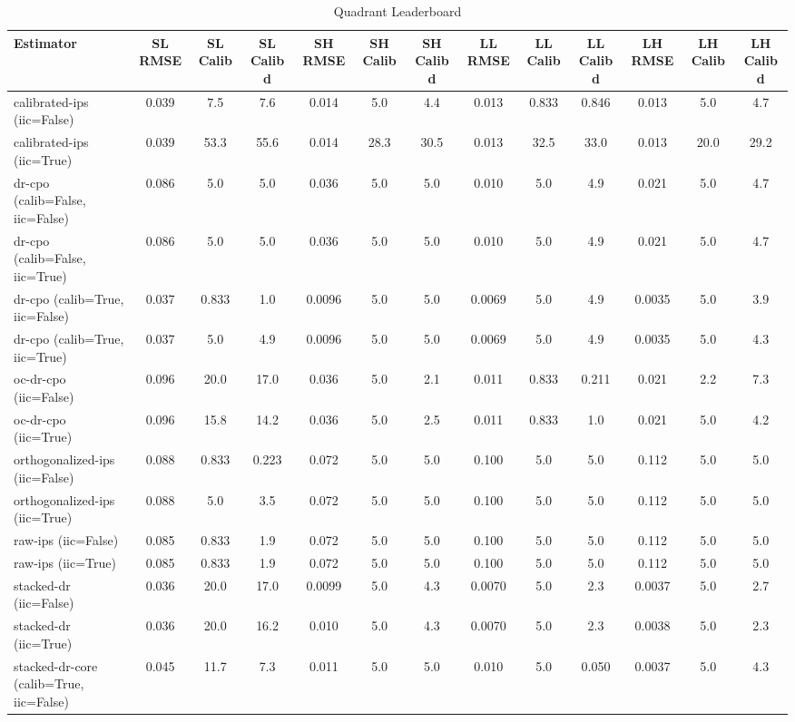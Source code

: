 \begin{table}[htbp]
\centering
\caption{Quadrant Leaderboard}
\label{tab:A1}
\begin{tabular}{l|cccccccccccc}
\toprule
Estimator & SL RMSE & SL Calib & SL Calib d & SH RMSE & SH Calib & SH Calib d & LL RMSE & LL Calib & LL Calib d & LH RMSE & LH Calib & LH Calib d \\
\midrule
calibrated-ips (iic=False) & 0.039 & 7.5 & 7.6 & 0.014 & 5.0 & 4.4 & 0.013 & 0.833 & 0.846 & 0.013 & 5.0 & 4.7 \\
calibrated-ips (iic=True) & 0.039 & 53.3 & 55.6 & 0.014 & 28.3 & 30.5 & 0.013 & 32.5 & 33.0 & 0.013 & 20.0 & 29.2 \\
dr-cpo (calib=False, iic=False) & 0.086 & 5.0 & 5.0 & 0.036 & 5.0 & 5.0 & 0.010 & 5.0 & 4.9 & 0.021 & 5.0 & 4.7 \\
dr-cpo (calib=False, iic=True) & 0.086 & 5.0 & 5.0 & 0.036 & 5.0 & 5.0 & 0.010 & 5.0 & 4.9 & 0.021 & 5.0 & 4.7 \\
dr-cpo (calib=True, iic=False) & 0.037 & 0.833 & 1.0 & 0.0096 & 5.0 & 5.0 & 0.0069 & 5.0 & 4.9 & 0.0035 & 5.0 & 3.9 \\
dr-cpo (calib=True, iic=True) & 0.037 & 5.0 & 4.9 & 0.0096 & 5.0 & 5.0 & 0.0069 & 5.0 & 4.9 & 0.0035 & 5.0 & 4.3 \\
oc-dr-cpo (iic=False) & 0.096 & 20.0 & 17.0 & 0.036 & 5.0 & 2.1 & 0.011 & 0.833 & 0.211 & 0.021 & 2.2 & 7.3 \\
oc-dr-cpo (iic=True) & 0.096 & 15.8 & 14.2 & 0.036 & 5.0 & 2.5 & 0.011 & 0.833 & 1.0 & 0.021 & 5.0 & 4.2 \\
orthogonalized-ips (iic=False) & 0.088 & 0.833 & 0.223 & 0.072 & 5.0 & 5.0 & 0.100 & 5.0 & 5.0 & 0.112 & 5.0 & 5.0 \\
orthogonalized-ips (iic=True) & 0.088 & 5.0 & 3.5 & 0.072 & 5.0 & 5.0 & 0.100 & 5.0 & 5.0 & 0.112 & 5.0 & 5.0 \\
raw-ips (iic=False) & 0.085 & 0.833 & 1.9 & 0.072 & 5.0 & 5.0 & 0.100 & 5.0 & 5.0 & 0.112 & 5.0 & 5.0 \\
raw-ips (iic=True) & 0.085 & 0.833 & 1.9 & 0.072 & 5.0 & 5.0 & 0.100 & 5.0 & 5.0 & 0.112 & 5.0 & 5.0 \\
stacked-dr (iic=False) & 0.036 & 20.0 & 17.0 & 0.0099 & 5.0 & 4.3 & 0.0070 & 5.0 & 2.3 & 0.0037 & 5.0 & 2.7 \\
stacked-dr (iic=True) & 0.036 & 20.0 & 16.2 & 0.010 & 5.0 & 4.3 & 0.0070 & 5.0 & 2.3 & 0.0038 & 5.0 & 2.3 \\
stacked-dr-core (calib=True, iic=False) & 0.045 & 11.7 & 7.3 & 0.011 & 5.0 & 5.0 & 0.010 & 5.0 & 0.050 & 0.0037 & 5.0 & 4.3 \\

\end{tabular}
\end{table}
